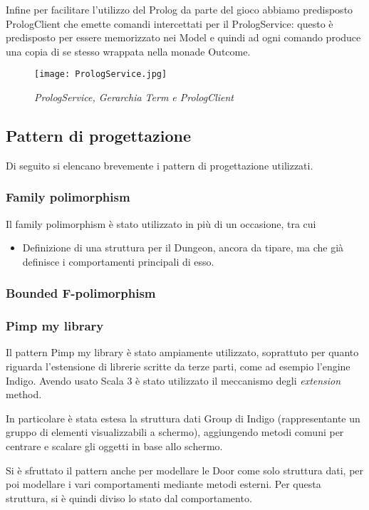 Infine per facilitare l'utilizzo del Prolog da parte del gioco abbiamo predisposto PrologClient che emette comandi intercettati per il PrologService: questo è predisposto per essere memorizzato nei Model e quindi ad ogni comando produce una copia di se stesso wrappata nella monade Outcome.

\begin{figure}[!hbt]
    \centering
    \texttt{[image: PrologService.jpg]}
    \caption{\textit{PrologService, Gerarchia Term e PrologClient}} 
\end{figure}

\subsection{Pattern di progettazione}
Di seguito si elencano brevemente i pattern di progettazione utilizzati. 
\subsubsection{Family polimorphism}
Il family polimorphism è stato utilizzato in più di un occasione, tra cui
\begin{itemize}
    \item Definizione di una struttura per il Dungeon, ancora da tipare, ma che già definisce i comportamenti principali di esso.
\end{itemize}
\subsubsection{Bounded F-polimorphism}
\subsubsection{Pimp my library}
Il pattern Pimp my library è stato ampiamente utilizzato, soprattuto per quanto riguarda l'estensione di librerie scritte da terze parti, come ad esempio l'engine Indigo. 
Avendo usato Scala 3 è stato utilizzato il meccanismo degli \textit{extension} method.

In particolare è stata estesa la struttura dati Group di Indigo (rappresentante un gruppo di elementi visualizzabili a schermo), aggiungendo metodi comuni per centrare e scalare gli oggetti in base allo schermo.

Si è sfruttato il pattern anche per modellare le Door come solo struttura dati, per poi modellare i vari comportamenti mediante metodi esterni. Per questa struttura, si è quindi diviso lo stato dal comportamento. 

